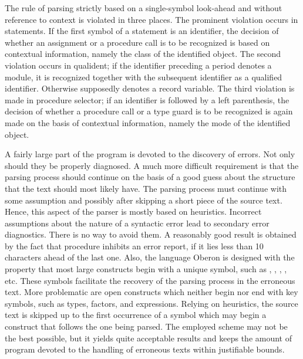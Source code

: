 The rule of parsing strictly based on a single-symbol look-ahead and without reference to context is violated in three places. The prominent violation occurs in statements. If the first symbol of a statement is an identifier, the decision of whether an assignment or a procedure call is to be recognized is based on contextual information, namely the class of the identified object. The second violation occurs in qualident; if the identifier  preceding a period denotes a module, it is recognized together with the subsequent identifier as a qualified identifier. Otherwise  supposedly denotes a record variable. The third violation is made in procedure selector; if an identifier is followed by a left parenthesis, the decision of whether a procedure call or a type guard is to be recognized is again made on the basis of contextual information, namely the mode of the identified object.

A fairly large part of the program is devoted to the discovery of errors. Not only should they be properly diagnosed. A much more difficult requirement is that the parsing process should continue on the basis of a good guess about the structure that the text should most likely have. The parsing process must continue with some assumption and possibly after skipping a short piece of the source text. Hence, this aspect of the parser is mostly based on heuristics. Incorrect assumptions about the nature of a syntactic error lead to secondary error diagnostics. There is no way to avoid them. A reasonably good result is obtained by the fact that procedure  inhibits an error report, if it lies less than 10 characters ahead of the last one. Also, the language Oberon is designed with the property that most large constructs begin with a unique symbol, such as , , , , etc. These symbols facilitate the recovery of the parsing process in the erroneous text. More problematic are open constructs which neither begin nor end with key symbols, such as types, factors, and expressions. Relying on heuristics, the source text is skipped up to the first occurrence of a symbol which may begin a construct that follows the one being parsed. The employed scheme may not be the best possible, but it yields quite acceptable results and keeps the amount of program devoted to the handling of erroneous texts within justifiable bounds.

